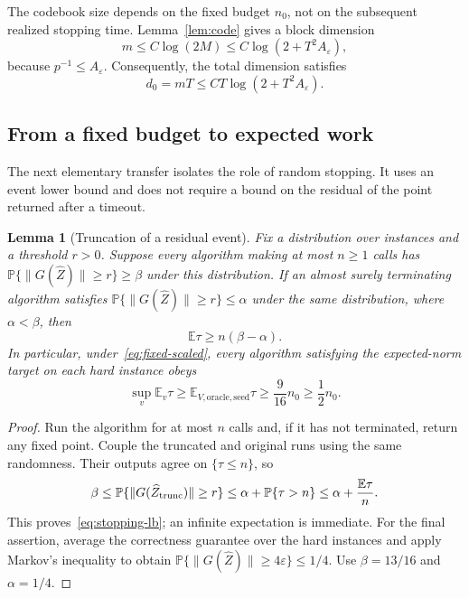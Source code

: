 \documentclass[11pt,a4paper]{article}
\newcommand{\E}{\mathbb E}
\newcommand{\Pp}{\mathbb P}
\newcommand{\eps}{\varepsilon}
\newtheorem{lemma}[theorem]{Lemma}
\theoremstyle{definition}
\theoremstyle{remark}
\begin{document}
The codebook size depends on the fixed budget $n_0$, not on the subsequent
realized stopping time. Lemma~\ref{lem:code} gives a block dimension
\begin{equation}\label{eq:block-dimension}
 m\le C\log(2M)\le C\log(2+T^2A_\eps),
\end{equation}
because $p^{-1}\le A_\eps$. Consequently, the total dimension satisfies
\begin{equation}\label{eq:total-dimension}
 d_0=mT\le CT\log(2+T^2A_\eps).
\end{equation}

\subsection{From a fixed budget to expected work}
The next elementary transfer isolates the role of random stopping. It uses
an event lower bound and does not require a bound on the residual of the
point returned after a timeout.

\begin{lemma}[Truncation of a residual event]\label{lem:stopping}
Fix a distribution over instances and a threshold $r>0$. Suppose every
algorithm making at most $n\ge1$ calls has
$\Pp\{\|G(\widehat Z)\|\ge r\}\ge\beta$ under this distribution.
If an almost surely terminating algorithm satisfies
$\Pp\{\|G(\widehat Z)\|\ge r\}\le\alpha$ under the same distribution,
where $\alpha<\beta$, then
\begin{equation}\label{eq:stopping-lb}
 \E\tau\ge n(\beta-\alpha).
\end{equation}
In particular, under~\eqref{eq:fixed-scaled}, every algorithm satisfying
the expected-norm target on each hard instance obeys
\begin{equation}\label{eq:stopping-chain}
 \sup_v\E_v\tau\ge\E_{V,\mathrm{oracle},\mathrm{seed}}\tau
 \ge\frac9{16}n_0\ge\frac12n_0.
\end{equation}
\end{lemma}
\begin{proof}
Run the algorithm for at most $n$ calls and, if it has not terminated,
return any fixed point. Couple the truncated and original runs using the
same randomness. Their outputs agree on $\{\tau\le n\}$, so
\[
 \beta\le\Pp\{\|G(\widehat Z_{\rm trunc})\|\ge r\}
 \le\alpha+\Pp\{\tau>n\}
 \le\alpha+\frac{\E\tau}{n}.
\]
This proves~\eqref{eq:stopping-lb}; an infinite expectation is immediate.
For the final assertion, average the correctness guarantee over the hard
instances and apply Markov's inequality to obtain
$\Pp\{\|G(\widehat Z)\|\ge4\eps\}\le1/4$.
Use $\beta=13/16$ and $\alpha=1/4$.
\end{proof}
\end{document}
